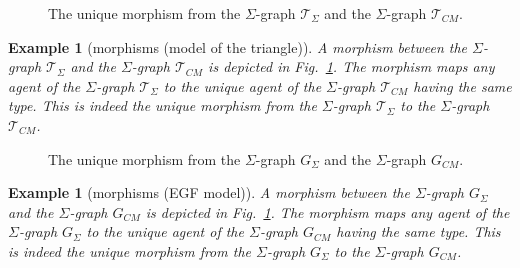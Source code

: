 \documentclass{entcs}
\newcommand{\graphsymb}{G}
\newtheorem{myexample}[thm]{Example}
\begin{document}
\begin{figure}[t]
\hfill{}\hfill\mbox{}
\caption{The unique morphism from the $\Sigma$-graph $\mathcal{T}_{\Sigma}$
and the $\Sigma$-graph $\mathcal{T}_{\textit{CM}}$.}
\label{fig:abc:embed}
\end{figure}
\begin{myexample}[morphisms (model of the triangle)]
  \renewcommand{\graphsymb}{\mathcal{T}}
A morphism between the $\Sigma$-graph $\graphsymb_{\Sigma}$ and the $\Sigma$-graph $\graphsymb_{\textit{CM}}$ is depicted in Fig.~\ref{fig:abc:embed}. The morphism maps any agent of the $\Sigma$-graph
$\graphsymb_{\Sigma}$ to the unique agent of the $\Sigma$-graph $\graphsymb_{\textit{CM}}$ having the same type.
This is indeed the unique morphism from the  $\Sigma$-graph
$\graphsymb_{\Sigma}$ to the $\Sigma$-graph $\graphsymb_{\textit{CM}}$.
\end{myexample}

\begin{figure}[t]
\hfill{}\hfill\mbox{}
\caption{The unique morphism from the $\Sigma$-graph $\graphsymb_{\Sigma}$
and the $\Sigma$-graph $\graphsymb_{\textit{CM}}$.}
  \label{fig:egfr:embed}
\end{figure}
\begin{myexample}[morphisms (EGF model)]

A morphism between the $\Sigma$-graph $\graphsymb_{\Sigma}$ and the $\Sigma$-graph $\graphsymb_{\textit{CM}}$ is depicted in Fig.~\ref{fig:abc:embed}. The morphism maps any agent of the $\Sigma$-graph
$\graphsymb_{\Sigma}$ to the unique agent of the $\Sigma$-graph $\graphsymb_{\textit{CM}}$ having the same type.
This is indeed the unique morphism from the  $\Sigma$-graph
$\graphsymb_{\Sigma}$ to the $\Sigma$-graph $\graphsymb_{\textit{CM}}$.
\end{myexample}

\end{document}
